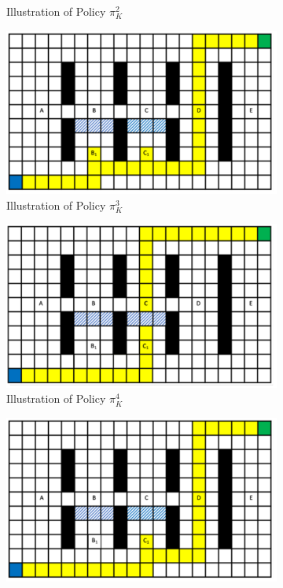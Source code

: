 \documentclass[a4paper,12pt]{article}
\begin{document}
\begin{figure}[htp]
\begin{subfigure}{.45\textwidth}
					\caption{Illustration of Policy $\pi_{K}^{2}$}
					\label{fig:policy2Diagram}
				\end{subfigure}
				\begin{subfigure}{.45\textwidth}
					\centering
					\includegraphics[width=\textwidth]{replannedPathAisleC}
					\caption{Illustration of Policy $\pi_{K}^{3}$}
					\label{fig:policy3Diagram}
				\end{subfigure}
				\begin{subfigure}{.45\textwidth}
					\centering
					\includegraphics[width=\textwidth]{blockedAisleCWait2}
					\caption{Illustration of Policy $\pi_{K}^{4}$}
					\label{fig:policy4Diagram}
				\end{subfigure}
				\begin{subfigure}{.45\textwidth}
					\centering
					\includegraphics[width=\textwidth]{replannedPathAisleC2}

\end{subfigure}
\end{figure}
\end{document}
